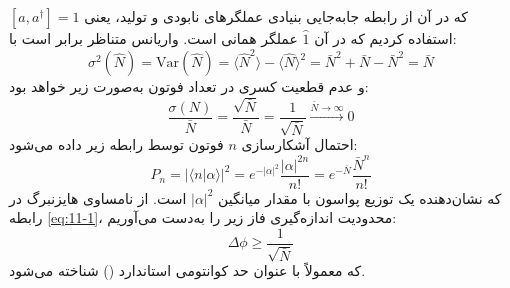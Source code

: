 که در آن از رابطه جابه‌جایی بنیادی عملگرهای نابودی و تولید، یعنی $[a, a^\dagger] = \hat{1}$ استفاده کردیم که در آن $\hat{1}$ عملگر همانی است.
واریانس متناظر برابر است با:
\begin{equation}
	\sigma^2(\hat{N}) = \text{Var}(\hat{N}) = \langle \hat{N}^2 \rangle - \langle \hat{N} \rangle^2 = \bar{N}^2 + \bar{N} - \bar{N}^2 = \bar{N}
	\label{eq:11-5}
\end{equation}
و عدم قطعیت کسری در تعداد فوتون به‌صورت زیر خواهد بود:
\begin{equation}
	\frac{\sigma(N)}{\bar{N}} = \frac{\sqrt{\bar{N}}}{\bar{N}} = \frac{1}{\sqrt{\bar{N}}} \xrightarrow{\bar{N} \to \infty} 0
	\label{eq:11-6}
\end{equation}
احتمال آشکارسازی $n$ فوتون توسط رابطه زیر داده می‌شود:
\begin{equation}
	P_n = |\langle n | \alpha \rangle|^2 = e^{-|\alpha|^2} \frac{|\alpha|^{2n}}{n!} = e^{-\bar{N}} \frac{\bar{N}^n}{n!}
	\label{eq:11-7}
\end{equation}
که نشان‌دهنده یک توزیع پواسون با مقدار میانگین $|\alpha|^2$ است.
از نامساوی هایزنبرگ در رابطه \eqref{eq:11-1}، محدودیت اندازه‌گیری فاز زیر را به‌دست می‌آوریم:
\begin{equation}
	\Delta \phi \geq \frac{1}{\sqrt{\bar{N}}}
	\label{eq:11-8}
\end{equation}
که معمولاً با عنوان حد کوانتومی استاندارد () شناخته می‌شود.


